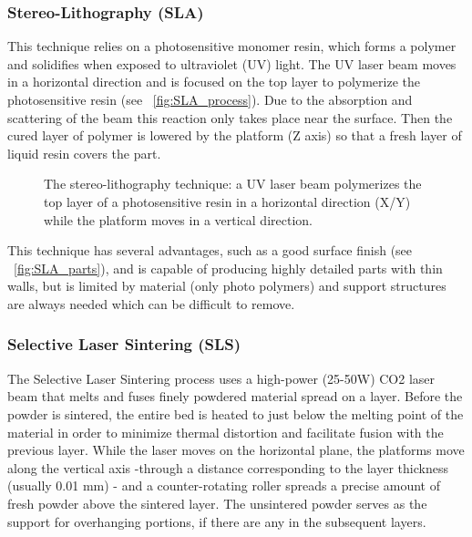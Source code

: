 \subsubsection{Stereo-Lithography (SLA)} %

This technique relies on a photosensitive monomer resin, which forms a polymer and solidifies when exposed to ultraviolet (UV) light. The UV laser beam moves in a horizontal direction and is focused on the top layer to polymerize the photosensitive resin (see \figurename~\ref{fig:SLA_process}). Due to the absorption and scattering of the beam this reaction only takes place near the surface. Then the cured layer of polymer is lowered by the platform (Z axis) so that a fresh layer of liquid resin covers the part.

\begin{figure}[tb]
    \centering
        \hfil
        \hfil
    \caption{The stereo-lithography technique: a UV laser beam polymerizes the top layer of a photosensitive resin in a horizontal direction (X/Y) while the platform moves in a vertical direction.}
    \label{fig:SLA_technique}
\end{figure}

This technique has several advantages, such as a good surface finish (see \figurename~\ref{fig:SLA_parts}), and is capable of producing highly detailed parts with thin walls, but is limited by material (only photo polymers) and support structures are always needed which can be difficult to remove.

\subsubsection{Selective Laser Sintering (SLS)} %
The Selective Laser Sintering process uses a high-power (25-50W) CO2 laser beam that melts and fuses finely powdered material spread on a layer. Before the powder is sintered, the entire bed is heated to just below the melting point of the material in order to minimize thermal distortion and facilitate fusion with the previous layer.
While the laser moves on the horizontal plane, the platforms move along the vertical axis -through a distance corresponding to the layer thickness (usually 0.01 mm) - and a counter-rotating roller spreads a precise amount of fresh powder above the sintered layer. The unsintered powder serves as the support for overhanging portions, if there are any in the subsequent layers.

